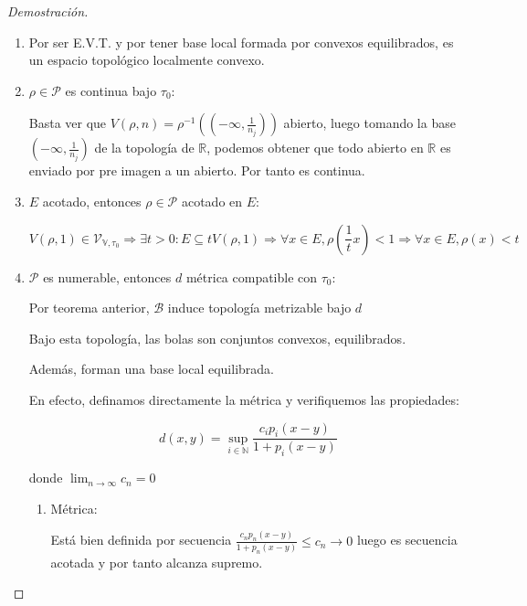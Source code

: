 \begin{proof}[Demostración]
\begin{enumerate}
\begin{enumerate}
			Luego para toda vecindad de la imagen hay una vecindad de la pre imagen $(x+tV) \times B_{\frac{1}{s}}(\alpha)$ contenida en la imagen. Por tanto es continua.
		\end{enumerate}
		
		\item Por ser E.V.T. y por tener base local formada por convexos equilibrados, es un espacio topológico localmente convexo.
		
		\item $\rho \in \mathcal{P}$ es continua bajo $\tau_0$:
		
		Basta ver que $V(\rho, n) = \rho^{-1} ((-\infty, \frac{1}{n_j} ))$ abierto, luego tomando la base $(-\infty, \frac{1}{n_j} )$ de la topología de $\mathbb{R}$, podemos obtener que todo abierto en $\mathbb{R}$ es enviado por pre imagen a un abierto. Por tanto es continua.
		
		\item $E$ acotado, entonces $\rho \in \mathcal{P}$ acotado en $E$:
		
		\begin{equation*}
			V(\rho,1) \in \mathcal{V}_{\mathbb{V}, \tau_0} \Rightarrow \exists t >0 : E \subseteq tV(\rho,1) \Rightarrow \forall x \in E, \rho(\frac{1}{t} x ) <1 \Rightarrow\forall x \in E, \rho( x ) <t
		\end{equation*}
		
		
		\item $\mathcal{P}$ es numerable, entonces $d$ métrica compatible con $\tau_0$:
		
		Por teorema anterior, $\mathcal{B}$  induce topología metrizable bajo $d$
		
		Bajo esta topología, las bolas son conjuntos convexos, equilibrados.
		
		Además, forman una base local equilibrada.
		
		En efecto, definamos directamente la métrica y verifiquemos las propiedades:
		
		\begin{equation*}
			d(x,y) = \sup_{i \in \mathbb{N}} \frac{c_i p_i(x-y)}{1+p_i(x-y)}
		\end{equation*}
		
		donde $\lim_{n \to \infty} c_n = 0$
		
		\begin{enumerate}
			\item Métrica:
			
			Está bien definida por secuencia $\frac{c_n p_n(x-y)}{1+p_n(x-y)} \leq c_n \to 0$ luego es secuencia acotada y por tanto alcanza supremo.
			

\end{enumerate}
\end{enumerate}
\end{proof}
